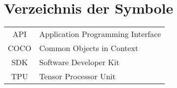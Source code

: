 %
%
%


\chapter*{Verzeichnis der Symbole}




\begin{longtable}{cl}
  API        & Application Programming Interface \\
  COCO       & Common Objects in Context\\
  SDK        & Software Developer Kit \\
  TPU        & Tensor Processor Unit \\
\end{longtable}